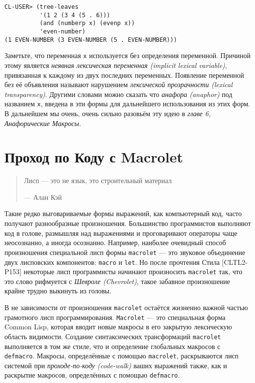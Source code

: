 \begin{verbatim}
CL-USER> (tree-leaves
          '(1 2 (3 4 (5 . 6)))
          (and (numberp x) (evenp x))
          'even-number)
(1 EVEN-NUMBER (3 EVEN-NUMBER (5 . EVEN-NUMBER)))
\end{verbatim}

Заметьте, что переменная \verb"x" используется без определения переменной. Причиной этому является \emph{неявная лексическая переменная (implicit lexical variable)}, привязанная к каждому из двух последних переменных. Появление переменной без её объявления называют нарушением \emph{лексической прозрачности (lexical transparency)}. Другими словами можно сказать что \emph{анафора (anaphor)} под названием \verb"x", введена в эти формы для дальнейшего использования из этих форм. В дальнейшем мы очень, очень сильно разовьём эту идею в \emph{главе 6, Анафорические Макросы}.

\section{Проход по Коду с Macrolet}\label{section_code-walking_with_macrolet}

\begin{quote}
Лисп --- это не язык, это строительный материал

--- Алан Кэй
\end{quote}

Такие редко выговариваемые формы выражений, как компьютерный код, часто получают разнообразные произношения. Большинство программистов выполняют код в голове, размышляя над выражениями и проговаривают операторы чаще неосознанно, а иногда осознанно. Например, наиболее очевидный способ произношения специальной лисп формы \verb"macrolet" --- это звуковое объединение двух лисповских компонентов: \verb"macro" и \verb"let". Но после прочтения Стила [CLTL2-P153] некоторые лисп программисты начинают произносить \verb"macrolet" так, что это слово рифмуется с \emph{Шевроле (Chevrolet)}, такое забавное произношение крайне трудно выкинуть из головы.

В не зависимости от произношения \verb"macrolet" остаётся жизненно важной частью грамотного лисп программирования. \verb"Macrolet" --- это специальная форма Common Lisp, которая вводит новые макросы в его закрытую лексическую область видимости. Создание синтаксических трансформаций \verb"macrolet" выполняется в том же стиле, что и определение глобальных макросов с \verb"defmacro". Макросы, определённые с помощью \verb"macrolet", раскрываются лисп системой при \emph{проходе-по-коду (code-walk)} ваших выражений также, как и раскрытие макросов, определённых с помощью \verb"defmacro".

